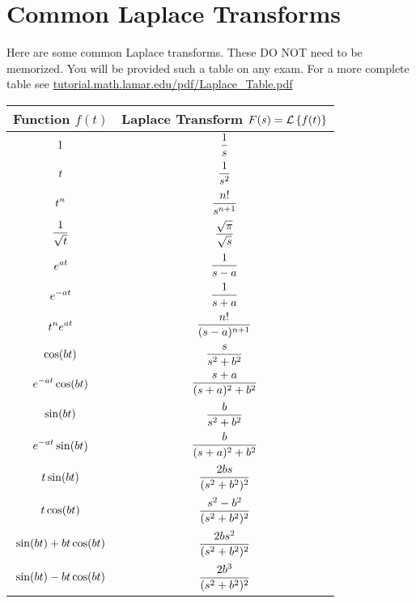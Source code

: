 \newpage\section{Common Laplace Transforms}
Here are some common Laplace transforms.  These DO NOT need to be memorized.  You will be
provided such a table on any exam.  For a more complete table see
\href{http://tutorial.math.lamar.edu/pdf/Laplace_Table.pdf}{tutorial.math.lamar.edu/pdf/Laplace\_Table.pdf}
\begin{center}
    \setlength\extrarowheight{10pt}
    \begin{tabular}{|c|c|}
        \hline
        Function $f(t)$ & Laplace Transform $F(s) = \mathcal{L}\left\{ f(t) \right\}$ \\ \hline \hline
        $\displaystyle 1$ & $\displaystyle \frac{1}{s}$ \\\hline
        $\displaystyle t$ & $\displaystyle \frac{1}{s^2}$ \\\hline
        $\displaystyle t^n$ & $\displaystyle \frac{n!}{s^{n+1}}$ \\\hline
        $\displaystyle \frac{1}{\sqrt{t}}$ & $\displaystyle \frac{\sqrt{\pi}}{\sqrt{s}}$ \\\hline
        $\displaystyle e^{at}$ & $\displaystyle \frac{1}{s-a}$ \\\hline
        $\displaystyle e^{-at}$ & $\displaystyle \frac{1}{s+a}$ \\\hline
        $\displaystyle t^n e^{at}$ & $\displaystyle \frac{n!}{(s-a)^{n+1}}$ \\\hline
        $\displaystyle \cos(bt)$ & $\displaystyle \frac{s}{s^2 + b^2}$ \\\hline
        $\displaystyle e^{-at}\cos(bt)$ & $\displaystyle \frac{s+a}{(s+a)^2+b^2}$ \\\hline
        $\displaystyle \sin(bt)$ & $\displaystyle \frac{b}{s^2+b^2}$ \\\hline
        $\displaystyle e^{-at}\sin(bt)$ & $\displaystyle \frac{b}{(s+a)^2+b^2}$ \\\hline
        $\displaystyle t \sin(bt)$ & $\displaystyle \frac{2bs}{(s^2+b^2)^2}$ \\\hline
        $\displaystyle t \cos(bt)$ & $\displaystyle \frac{s^2-b^2}{(s^2+b^2)^2}$ \\\hline
        $\displaystyle \sin(bt) + bt \cos(bt)$ & $\displaystyle \frac{2bs^2}{(s^2+b^2)^2}$ \\\hline
        $\displaystyle \sin(bt) - bt \cos(bt)$ & $\displaystyle \frac{2b^3}{(s^2+b^2)^2}$ \\\hline
    \end{tabular}
\end{center}

